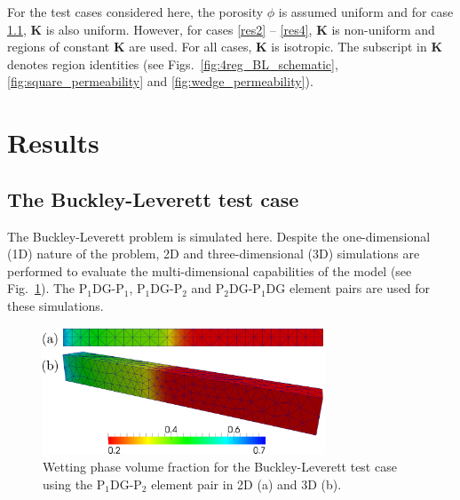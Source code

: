 \documentclass[preprint,authoryear,12pt]{elsarticle}
\newcommand{\PN}[2][error]{P$_{#1}$DG-P$_{#2}$}
\begin{document}
For the test cases considered here, the porosity $\phi$ is assumed
uniform and for case \ref{classical_BL}, $\mathbf{K}$ is also
uniform. However, for cases \ref{res2} -- \ref{res4}, $\mathbf{K}$ is
non-uniform and regions of constant $\mathbf{K}$ are used. For all
cases, $\mathbf{K}$ is isotropic. The subscript in $\mathbf{K}$
denotes region identities (see Figs.~\ref{fig:4reg_BL_schematic},
\ref{fig:square_permeability} and \ref{fig:wedge_permeability}).



\section{Results}\label{res}
\subsection{The Buckley-Leverett test case}\label{classical_BL}

The Buckley-Leverett problem \citep[non-wetting phase displaced by a
  wetting phase,][]{buckley1942} is simulated here.  Despite the
one-dimensional (1D) nature of the problem, 2D and three-dimensional
(3D) simulations are performed to evaluate the multi-dimensional
capabilities of the model (see Fig.~\ref{fig:maps2d_3d}). The
\PN[1]{1}, \PN[1]{2} and \PN[2]{1}DG element pairs are used for these
simulations.


\begin{figure}[h!]
  \begin{center}
    \includegraphics[width=0.75\textwidth]{BL_3D_merged}
    \caption{Wetting phase volume fraction for the Buckley-Leverett
      test case using the \PN[1]{2} element pair in 2D (a) and 3D
      (b). \label{fig:maps2d_3d}}
  \end{center}
\end{figure}
\end{document}
